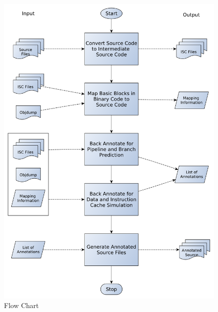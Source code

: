 \begin{figure}[h!]
\center
\includegraphics[width=.9\textwidth]{figures/HCS_FlowChart.pdf}
\caption{Flow Chart}
\label{fig:hcsFlowChart}
\end{figure}


